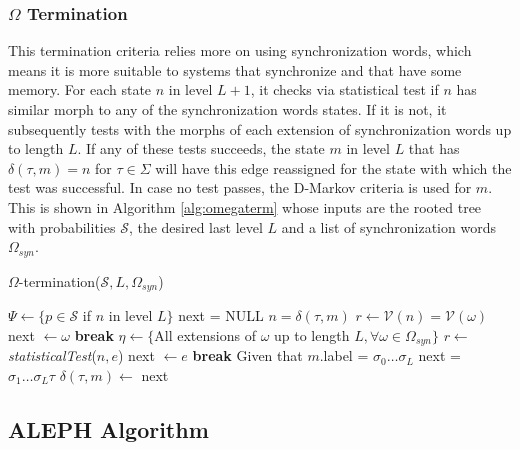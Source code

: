 {\subsubsection{$\Omega$ Termination}

This termination criteria relies more on using synchronization words, which means it is more suitable to systems that synchronize and that have some memory. For each state $n$ in level $L+1$, it checks via statistical test if $n$ has similar morph to any of the synchronization words states. If it is not, it subsequently tests with the morphs of each extension of synchronization words up to length $L$. If any of these tests succeeds, the state $m$ in level $L$ that has $\delta(\tau,m) = n$ for $\tau \in \Sigma$ will have this edge reassigned for the state with which the test was successful. In case no test passes, the D-Markov criteria is used for $m$. This is shown in Algorithm \ref{alg:omegaterm} whose inputs are the rooted tree with probabilities $\mathcal{S}$, the desired last level $L$ and a list of synchronization words $\Omega_{syn}$.  

  \begin{algorithm}
  \caption{$\Omega$-termination($\mathcal{S}, L, \Omega_{syn}$)\label{alg:omegaterm}}
    \begin{algorithmic}[1]
      	\State $\Psi \gets \{p \in \mathcal{S}$ if $n$ in level $L\}$
      		\State next = NULL
      		\For{$\tau \in \Sigma$}
      			\State $n = \delta(\tau,m)$
      				\State $r \gets \mathcal{V}(n) = \mathcal{V}(\omega)$
      					\State next $\gets \omega$
      					\State \textbf{break}
      				\EndIf
      			\EndFor
      				\State $\eta \gets \{$All extensions of $\omega$ up to length $L, \forall \omega \in \Omega_{syn}\}$
      				\State $r \gets$ \textit{statisticalTest}($n, e$)
      						\State next $\gets e$
      						\State \textbf{break}
      					\EndIf
      				\EndFor
      			\EndIf
      				\State Given that $m$.label = $\sigma_0\ldots\sigma_L$
      				\State next = $\sigma_1\ldots\sigma_L\tau$
      			\EndIf
      			\State $\delta(\tau,m) \gets$ next
      		\EndFor
      	\EndFor
      \EndProcedure
    \end{algorithmic}
  \end{algorithm}

\subsection{ALEPH Algorithm}

}
